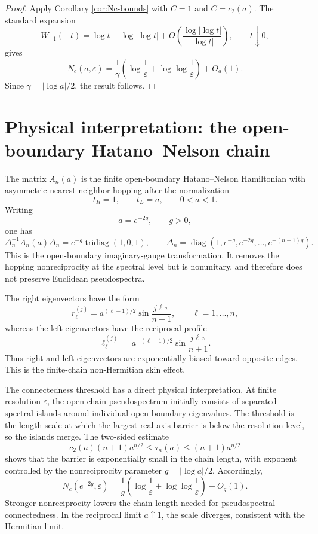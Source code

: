 \documentclass[11pt]{amsart}
\numberwithin{equation}{section}
\DeclareMathOperator{\tridiag}{tridiag}
\DeclareMathOperator{\diag}{diag}
\newcommand{\eps}{\varepsilon}
\begin{document}
\begin{proof}
Apply Corollary \ref{cor:Nc-bounds} with \(C=1\) and \(C=c_2(a)\).  The standard expansion
\[
W_{-1}(-t)
=
\log t-\log|\log t|+O\!\left(\frac{\log|\log t|}{|\log t|}\right),
\qquad t\downarrow0,
\]
gives
\[
N_c(a,\eps)
=
\frac1\gamma
\left(
\log\frac1\eps+\log\log\frac1\eps
\right)
+
O_a(1).
\]
Since \(\gamma=|\log a|/2\), the result follows.
\end{proof}

\section{Physical interpretation: the open-boundary Hatano--Nelson chain}

The matrix \(A_n(a)\) is the finite open-boundary Hatano--Nelson Hamiltonian with asymmetric nearest-neighbor hopping after the normalization
\[
t_R=1,\qquad t_L=a,\qquad 0<a<1.
\]
Writing
\[
a=e^{-2g},\qquad g>0,
\]
one has
\[
\Delta_n^{-1}A_n(a)\Delta_n
=
e^{-g}\tridiag(1,0,1),
\qquad
\Delta_n=\diag(1,e^{-g},e^{-2g},\dots,e^{-(n-1)g}).
\]
This is the open-boundary imaginary-gauge transformation.  It removes the hopping nonreciprocity at the spectral level but is nonunitary, and therefore does not preserve Euclidean pseudospectra.

The right eigenvectors have the form
\[
r^{(j)}_\ell
=
a^{(\ell-1)/2}\sin\frac{j\ell\pi}{n+1},
\qquad
\ell=1,\dots,n,
\]
whereas the left eigenvectors have the reciprocal profile
\[
\ell^{(j)}_\ell
=
a^{-(\ell-1)/2}\sin\frac{j\ell\pi}{n+1}.
\]
Thus right and left eigenvectors are exponentially biased toward opposite edges.  This is the finite-chain non-Hermitian skin effect.

The connectedness threshold has a direct physical interpretation.  At finite resolution \(\eps\), the open-chain pseudospectrum initially consists of separated spectral islands around individual open-boundary eigenvalues.  The threshold is the length scale at which the largest real-axis barrier is below the resolution level, so the islands merge.  The two-sided estimate
\[
c_2(a)(n+1)a^{n/2}
\le
\tau_n(a)
\le
(n+1)a^{n/2}
\]
shows that the barrier is exponentially small in the chain length, with exponent controlled by the nonreciprocity parameter \(g=|\log a|/2\).  Accordingly,
\[
N_c(e^{-2g},\eps)
=
\frac1g
\left(
\log\frac1\eps+\log\log\frac1\eps
\right)
+
O_g(1).
\]
Stronger nonreciprocity lowers the chain length needed for pseudospectral connectedness.  In the reciprocal limit \(a\uparrow1\), the scale diverges, consistent with the Hermitian limit.
\end{document}

